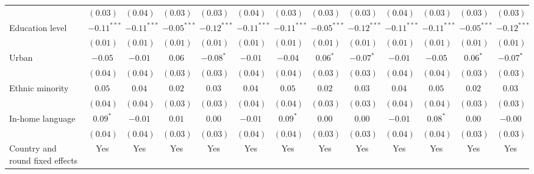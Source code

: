 \begin{table}
\begin{center}
\begin{threeparttable}
\begin{tabular}{l c c c c c c c c c c c c}
                                & $(0.03)$      & $(0.04)$      & $(0.03)$      & $(0.03)$      & $(0.04)$      & $(0.03)$      & $(0.03)$      & $(0.03)$      & $(0.04)$      & $(0.03)$      & $(0.03)$      & $(0.03)$      \\
Education level                 & $-0.11^{***}$ & $-0.11^{***}$ & $-0.05^{***}$ & $-0.12^{***}$ & $-0.11^{***}$ & $-0.11^{***}$ & $-0.05^{***}$ & $-0.12^{***}$ & $-0.11^{***}$ & $-0.11^{***}$ & $-0.05^{***}$ & $-0.12^{***}$ \\
                                & $(0.01)$      & $(0.01)$      & $(0.01)$      & $(0.01)$      & $(0.01)$      & $(0.01)$      & $(0.01)$      & $(0.01)$      & $(0.01)$      & $(0.01)$      & $(0.01)$      & $(0.01)$      \\
Urban                           & $-0.05$       & $-0.01$       & $0.06$        & $-0.08^{*}$   & $-0.01$       & $-0.04$       & $0.06^{*}$    & $-0.07^{*}$   & $-0.01$       & $-0.05$       & $0.06^{*}$    & $-0.07^{*}$   \\
                                & $(0.04)$      & $(0.04)$      & $(0.03)$      & $(0.03)$      & $(0.04)$      & $(0.04)$      & $(0.03)$      & $(0.03)$      & $(0.04)$      & $(0.04)$      & $(0.03)$      & $(0.03)$      \\
Ethnic minority                 & $0.05$        & $0.04$        & $0.02$        & $0.03$        & $0.04$        & $0.05$        & $0.02$        & $0.03$        & $0.04$        & $0.05$        & $0.02$        & $0.03$        \\
                                & $(0.04)$      & $(0.04)$      & $(0.03)$      & $(0.03)$      & $(0.04)$      & $(0.04)$      & $(0.03)$      & $(0.03)$      & $(0.04)$      & $(0.04)$      & $(0.03)$      & $(0.03)$      \\
In-home language                & $0.09^{*}$    & $-0.01$       & $0.01$        & $0.00$        & $-0.01$       & $0.09^{*}$    & $0.00$        & $0.00$        & $-0.01$       & $0.08^{*}$    & $0.00$        & $-0.00$       \\
                                & $(0.04)$      & $(0.04)$      & $(0.03)$      & $(0.03)$      & $(0.04)$      & $(0.04)$      & $(0.03)$      & $(0.03)$      & $(0.04)$      & $(0.04)$      & $(0.03)$      & $(0.03)$      \\
\midrule
Country and round fixed effects & Yes           & Yes           & Yes           & Yes           & Yes           & Yes           & Yes           & Yes           & Yes           & Yes           & Yes           & Yes           \\

\end{tabular}
\end{threeparttable}
\end{center}
\end{table}
